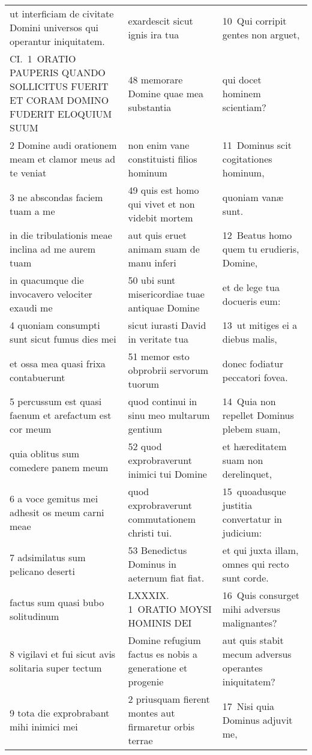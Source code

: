 \documentclass{article}
\begin{document}
\begin{longtable}{@{}p{}p{}p{}@{}}
ut interficiam de civitate Domini universos qui operantur iniquitatem.	&	exardescit sicut ignis ira tua	&	10 Qui corripit gentes non arguet,	\\
CI. 1 ORATIO PAUPERIS QUANDO SOLLICITUS FUERIT ET CORAM DOMINO FUDERIT ELOQUIUM SUUM	&	48 memorare Domine quae mea substantia	&	qui docet hominem scientiam?	\\
2 Domine audi orationem meam et clamor meus ad te veniat	&	non enim vane constituisti filios hominum	&	11 Dominus scit cogitationes hominum,	\\
3 ne abscondas faciem tuam a me	&	49 quis est homo qui vivet et non videbit mortem	&	quoniam vanæ sunt.	\\
in die tribulationis meae inclina ad me aurem tuam	&	aut quis eruet animam suam de manu inferi	&	12 Beatus homo quem tu erudieris, Domine,	\\
in quacumque die invocavero velociter exaudi me	&	50 ubi sunt misericordiae tuae antiquae Domine	&	et de lege tua docueris eum:	\\
4 quoniam consumpti sunt sicut fumus dies mei	&	sicut iurasti David in veritate tua	&	13 ut mitiges ei a diebus malis,	\\
et ossa mea quasi frixa contabuerunt	&	51 memor esto obprobrii servorum tuorum	&	donec fodiatur peccatori fovea.	\\
5 percussum est quasi faenum et arefactum est cor meum	&	quod continui in sinu meo multarum gentium	&	14 Quia non repellet Dominus plebem suam,	\\
quia oblitus sum comedere panem meum	&	52 quod exprobraverunt inimici tui Domine	&	et hæreditatem suam non derelinquet,	\\
6 a voce gemitus mei adhesit os meum carni meae	&	quod exprobraverunt commutationem christi tui.	&	15 quoadusque justitia convertatur in judicium:	\\
7 adsimilatus sum pelicano deserti	&	53 Benedictus Dominus in aeternum fiat fiat.	&	et qui juxta illam, omnes qui recto sunt corde.	\\
factus sum quasi bubo solitudinum	&	LXXXIX. 1 ORATIO MOYSI HOMINIS DEI	&	16 Quis consurget mihi adversus malignantes?	\\
8 vigilavi et fui sicut avis solitaria super tectum	&	Domine refugium factus es nobis a generatione et progenie	&	aut quis stabit mecum adversus operantes iniquitatem?	\\
9 tota die exprobrabant mihi inimici mei	&	2 priusquam fierent montes aut firmaretur orbis terrae	&	17 Nisi quia Dominus adjuvit me,	\\

\end{longtable}
\end{document}

